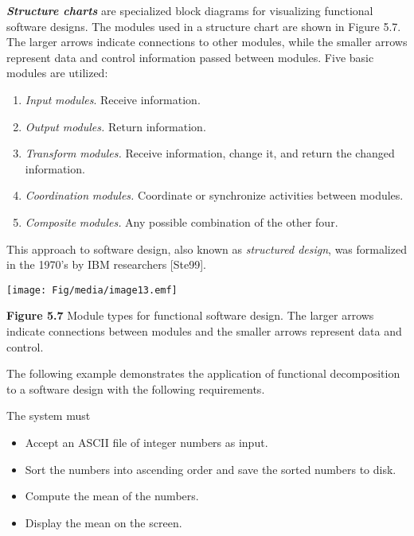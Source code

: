 \emph{\textbf{Structure charts}} are specialized block diagrams for
visualizing functional software designs. The modules used in a structure
chart are shown in Figure 5.7. The larger arrows indicate connections to
other modules, while the smaller arrows represent data and control
information passed between modules. Five basic modules are utilized:

\begin{enumerate}
\def\labelenumi{\arabic{enumi}.}
\item
  \emph{Input} \emph{modules}. Receive information.
\item
  \emph{Output} \emph{modules.} Return information.
\item
  \emph{Transform} \emph{modules.} Receive information, change it, and
  return the changed information.
\item
  \emph{Coordination} \emph{modules.} Coordinate or synchronize
  activities between modules.
\item
  \emph{Composite} \emph{modules.} Any possible combination of the other
  four.
\end{enumerate}

This approach to software design, also known as \emph{structured
design}, was formalized in the 1970's by IBM researchers {[}Ste99{]}.

\texttt{[image: Fig/media/image13.emf]}

\textbf{Figure 5.7} Module types for functional software design. The
larger arrows indicate connections between modules and the smaller
arrows represent data and control.

The following example demonstrates the application of functional
decomposition to a software design with the following requirements.

The system must

\begin{itemize}
\item
  Accept an ASCII file of integer numbers as input.
\item
  Sort the numbers into ascending order and save the sorted numbers to
  disk.
\item
  Compute the mean of the numbers.
\item
  Display the mean on the screen.
\end{itemize}

